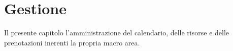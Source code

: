 \chapter{Gestione}
Il presente capitolo l'amministrazione del calendario, delle risorse e delle prenotazioni
inerenti la propria macro area.